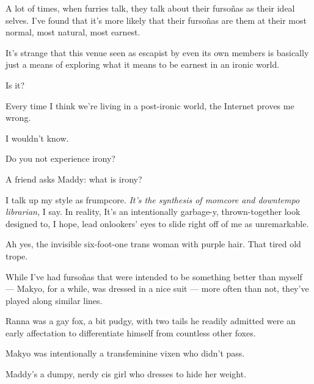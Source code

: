 \begin{paracol}{2}
  \begin{leftcolumn}

\noindent A lot of times, when furries talk, they talk about their fursoñas as their ideal selves. I've found that it's more likely that their fursoñas are them at their most normal, most natural, most earnest.

It's strange that this venue seen as escapist by even its own members is basically just a means of exploring what it means to be earnest in an ironic world.

\begin{ally}
Is it?
\end{ally}
Every time I think we're living in a post-ironic world, the Internet proves me wrong.

\begin{ally}
I wouldn't know.
\end{ally}
Do you not experience irony?

\begin{ally}
A friend asks Maddy: what is irony?
\end{ally}
\end{leftcolumn}
\begin{rightcolumn*}
  
\end{rightcolumn*}
\begin{leftcolumn}
\newpage

\noindent I talk up my style as frumpcore. \emph{It's the synthesis of momcore and downtempo librarian,} I say. In reality, It's an intentionally garbage-y, thrown-together look designed to, I hope, lead onlookers' eyes to slide right off of me as unremarkable.

\begin{ally}
Ah yes, the invisible six-foot-one trans woman with purple hair. That tired old trope.
\end{ally}
While I've had fursoñas that were intended to be something better than myself --- Makyo, for a while, was dressed in a nice suit --- more often than not, they've played along similar lines.

Ranna was a gay fox, a bit pudgy, with two tails he readily admitted were an early affectation to differentiate himself from countless other foxes.

Makyo was intentionally a transfeminine vixen who didn't pass.

Maddy's a dumpy, nerdy cis girl who dresses to hide her weight.


\end{leftcolumn}
\end{paracol}
